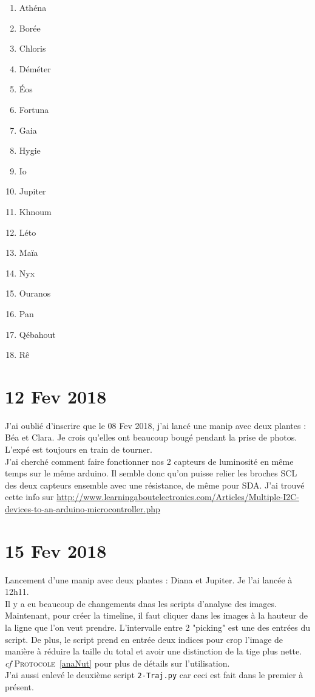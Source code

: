 \documentclass[10pt,a4paper]{article}
\begin{document}
\begin{multicols}{4}
    \begin{enumerate}
        \item Athéna
        \item Borée
        \item Chloris
        \item Déméter
        \item Éos
        \item Fortuna
        \item Gaia
        \item Hygie
        \item Io
        \item Jupiter
        \item Khnoum
        \item Léto
        \item Maïa
        \item Nyx
        \item Ouranos
        \item Pan
        \item Qébahout
        \item Rê
    \end{enumerate}
\end{multicols}

\section{12 Fev 2018}
J'ai oublié d'inscrire que le 08 Fev 2018, j'ai lancé une manip avec deux plantes : Béa et Clara. Je crois qu'elles ont beaucoup bougé pendant la prise de photos. L'expé est toujours en train de tourner.\\

J'ai cherché comment faire fonctionner nos 2 capteurs de luminosité en même temps sur le même arduino. Il semble donc qu'on puisse relier les broches SCL des deux capteurs ensemble avec une résistance, de même pour SDA. J'ai trouvé cette info sur \url{http://www.learningaboutelectronics.com/Articles/Multiple-I2C-devices-to-an-arduino-microcontroller.php}


\section{15 Fev 2018}
Lancement d'une manip avec deux plantes : Diana et Jupiter. Je l'ai lancée à 12h11.\\

Il y a eu beaucoup de changements dnas les scripts d'analyse des images. Maintenant, pour créer la timeline, il faut cliquer dans les images à la hauteur de la ligne que l'on veut prendre. L'intervalle entre 2 "picking" est une des entrées du script.  De plus, le script prend en entrée deux indices pour crop l'image de manière à réduire la taille du total et avoir une distinction de la tige plus nette. \textit{cf} \textsc{Protocole}~\ref{anaNut} pour plus de détails sur l'utilisation.\\ J'ai aussi enlevé le deuxième script \texttt{2-Traj.py} car ceci est fait dans le premier à présent.
\end{document}
